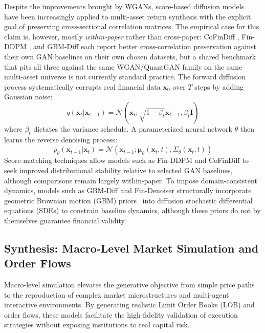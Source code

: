 \documentclass[11pt,a4paper]{article}
\begin{document}
Despite the improvements brought by WGANs, score-based diffusion models~\citep{song2019generative,song2021score} have been increasingly applied to multi-asset return synthesis with the explicit goal of preserving cross-sectional correlation matrices. The empirical case for this claim is, however, mostly \emph{within-paper} rather than cross-paper: CoFinDiff \citep{tanaka2025cofindiff}, Fin-DDPM \citep{takahashi2024generation}, and GBM-Diff \citep{kim2025gbm} each report better cross-correlation preservation against their own GAN baselines on their own chosen datasets, but a shared benchmark that pits all three against the same WGAN/QuantGAN family on the same multi-asset universe is not currently standard practice. The forward diffusion process systematically corrupts real financial data $\mathbf{x}_0$ over $T$ steps by adding Gaussian noise:
\begin{equation}
q(\mathbf{x}_t | \mathbf{x}_{t-1}) = \mathcal{N}(\mathbf{x}_t; \sqrt{1 - \beta_t}\mathbf{x}_{t-1}, \beta_t \mathbf{I})
\end{equation}
where $\beta_t$ dictates the variance schedule. A parameterized neural network $\theta$ then learns the reverse denoising process:
\begin{equation}
p_\theta(\mathbf{x}_{t-1} | \mathbf{x}_t) = \mathcal{N}(\mathbf{x}_{t-1}; \boldsymbol{\mu}_\theta(\mathbf{x}_t, t), \Sigma_\theta(\mathbf{x}_t, t))
\end{equation}
Score-matching techniques allow models such as Fin-DDPM and CoFinDiff \citep{takahashi2024generation, tanaka2025cofindiff} to seek improved distributional stability relative to selected GAN baselines, although comparisons remain largely within-paper. To impose domain-consistent dynamics, models such as GBM-Diff and Fin-Denoiser \citep{kim2025gbm, wang2024denoiser} structurally incorporate geometric Brownian motion (GBM) priors~\citep{black1973pricing} into diffusion stochastic differential equations (SDEs) to constrain baseline dynamics, although these priors do not by themselves guarantee financial validity.

\subsection{Synthesis: Macro-Level Market Simulation and Order Flows}

Macro-level simulation elevates the generative objective from simple price paths to the reproduction of complex market microstructures and multi-agent interactive environments. By generating realistic Limit Order Books (LOB) and order flows, these models facilitate the high-fidelity validation of execution strategies without exposing institutions to real capital risk.
\end{document}
